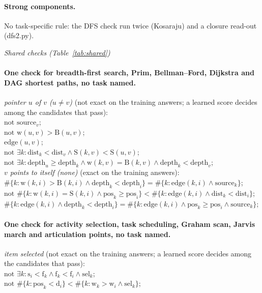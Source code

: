 \documentclass[10pt]{article}
\begin{document}
{\paragraph{Strong components.}
No task-specific rule: the DFS check run twice (Kosaraju) and a closure read-out (dfs2.py).

\medskip\noindent\textit{Shared checks (Table~\ref{tab:shared})}\par
\paragraph{One check for breadth-first search, Prim, Bellman--Ford, Dijkstra and DAG shortest paths, no task named.}
\emph{pointer $u$ of $v$ ($u \neq v$)} (not exact on the training answers; a learned score decides among the candidates that pass):\\
\quad $\text{not } \mathrm{source}_{v}$;\\
\quad $\text{not } \mathrm{w}(u,v) > \mathrm{B}(u,v)$;\\
\quad $\mathrm{edge}(u,v)$;\\
\quad $\text{not } \exists k: \mathrm{dist}_{k} < \mathrm{dist}_{v} \wedge \mathrm{S}(k,v) < \mathrm{S}(u,v)$;\\
\quad $\text{not } \exists k: \mathrm{depth}_{u} \geq \mathrm{depth}_{k} \wedge \mathrm{w}(k,v) = \mathrm{B}(k,v) \wedge \mathrm{depth}_{k} < \mathrm{depth}_{v}$;\\
\emph{$v$ points to itself (none)} (exact on the training answers):\\
\quad $\#\{k: \mathrm{w}(k,i) > \mathrm{B}(k,i) \wedge \mathrm{depth}_{k} < \mathrm{depth}_{i}\} = \#\{k: \mathrm{edge}(k,i) \wedge \mathrm{source}_k\}$;\\
\quad $\text{not } \#\{k: \mathrm{w}(k,i) = \mathrm{S}(k,i) \wedge \mathrm{pos}_{k} \geq \mathrm{pos}_{i}\} < \#\{k: \mathrm{edge}(k,i) \wedge \mathrm{dist}_{k} < \mathrm{dist}_{i}\}$;\\
\quad $\#\{k: \mathrm{edge}(k,i) \wedge \mathrm{depth}_{k} < \mathrm{depth}_{i}\} = \#\{k: \mathrm{edge}(k,i) \wedge \mathrm{pos}_{k} \geq \mathrm{pos}_{i} \wedge \mathrm{source}_k\}$;

\paragraph{One check for activity selection, task scheduling, Graham scan, Jarvis march and articulation points, no task named.}
\emph{item selected} (not exact on the training answers; a learned score decides among the candidates that pass):\\
\quad $\text{not } \exists k: \mathrm{s}_{i} < \mathrm{f}_{k} \wedge \mathrm{f}_{k} < \mathrm{f}_{i} \wedge \mathrm{sel}_k$;\\
\quad $\text{not } \#\{k: \mathrm{pos}_{k} < \mathrm{d}_{i}\} < \#\{k: \mathrm{w}_{k} > \mathrm{w}_{i} \wedge \mathrm{sel}_k\}$;
}
\end{document}

